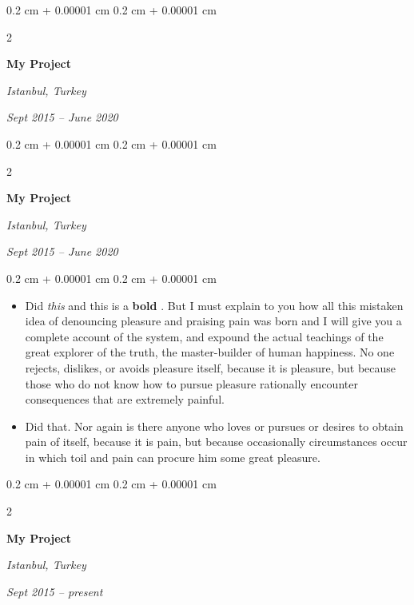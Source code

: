\documentclass[10pt, letterpaper]{article}
\newenvironment{highlights}{
    \begin{itemize}[
        topsep=0.10 cm,
        parsep=0.10 cm,
        partopsep=0pt,
        itemsep=0pt,
        leftmargin=0.4 cm + 10pt
    ]
}{
    \end{itemize}
} %
\newenvironment{onecolentry}{
    \begin{adjustwidth}{
        0.2 cm + 0.00001 cm
    }{
        0.2 cm + 0.00001 cm
    }
}{
    \end{adjustwidth}
} %
\newenvironment{twocolentry}[2][]{
    \onecolentry
    \def\secondColumn{#2}
    \setcolumnwidth{\fill, 4.5 cm}
    \begin{paracol}{2}
}{
    \switchcolumn \raggedleft \secondColumn
    \end{paracol}
    \endonecolentry
} %
\let\hrefWithoutArrow\href
\renewcommand{\href}[2]{\hrefWithoutArrow{#1}{\ifthenelse{\equal{#2}{}}{ }{#2 }\raisebox{.15ex}{\footnotesize \faExternalLink*}}}
\begin{document}
        \vspace{0.2 cm}

        \begin{twocolentry}{
        \textit{Istanbul, Turkey}    
            
        \textit{Sept 2015 – June 2020}}
            \textbf{My Project}
        \end{twocolentry}



        \vspace{0.2 cm}

        \begin{twocolentry}{
        \textit{Istanbul, Turkey}    
            
        \textit{Sept 2015 – June 2020}}
            \textbf{My Project}
        \end{twocolentry}

        \vspace{0.10 cm}
        \begin{onecolentry}
            \begin{highlights}
                \item Did \textit{this} and this is a \textbf{bold} \href{https://example.com}{link}. But I must explain to you how all this mistaken idea of denouncing pleasure and praising pain was born and I will give you a complete account of the system, and expound the actual teachings of the great explorer of the truth, the master-builder of human happiness. No one rejects, dislikes, or avoids pleasure itself, because it is pleasure, but because those who do not know how to pursue pleasure rationally encounter consequences that are extremely painful.
                \item Did that. Nor again is there anyone who loves or pursues or desires to obtain pain of itself, because it is pain, but because occasionally circumstances occur in which toil and pain can procure him some great pleasure.
            \end{highlights}
        \end{onecolentry}


        \vspace{0.2 cm}

        \begin{twocolentry}{
        \textit{Istanbul, Turkey}    
            
        \textit{Sept 2015 – present}}
            \textbf{My Project}
        \end{twocolentry}
\end{document}
